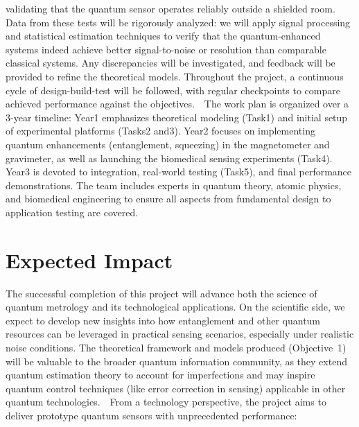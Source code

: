 \documentclass[12pt]{article}
\begin{document}
validating that the quantum sensor operates reliably outside a
shielded room. Data from these tests will be rigorously analyzed: we
will apply signal processing and statistical estimation techniques to
verify that the quantum-enhanced systems indeed achieve better
signal-to-noise or resolution than comparable classical systems. Any
discrepancies will be investigated, and feedback will be provided to
refine the theoretical models. Throughout the project, a continuous
cycle of design-build-test will be followed, with regular checkpoints
to compare achieved performance against the objectives.    The work
plan is organized over a 3-year timeline: Year1 emphasizes theoretical
modeling (Task1) and initial setup of experimental platforms (Tasks2
and3). Year2 focuses on implementing quantum enhancements
(entanglement, squeezing) in the magnetometer and gravimeter, as well
as launching the biomedical sensing experiments (Task4). Year3 is
devoted to integration, real-world testing (Task5), and final
performance demonstrations. The team includes experts in quantum
theory, atomic physics, and biomedical engineering to ensure all
aspects from fundamental design to application testing are covered.   

\section{Expected Impact}

The successful completion of this project will advance both the
science of quantum metrology and its technological applications. On
the scientific side, we expect to develop new insights into how
entanglement and other quantum resources can be leveraged in practical
sensing scenarios, especially under realistic noise conditions. The
theoretical framework and models produced (Objective~1) will be
valuable to the broader quantum information community, as they extend
quantum estimation theory to account for imperfections and may inspire
quantum control techniques (like error correction in sensing)
applicable in other quantum technologies.    From a technology
perspective, the project aims to deliver prototype quantum sensors
with unprecedented performance:
\end{document}
